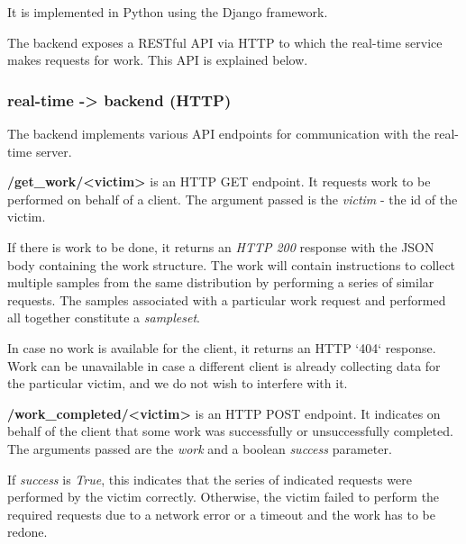 It is implemented in Python using the Django framework.

The backend exposes a RESTful API via HTTP to which the real-time service
makes requests for work. This API is explained below.

\subsubsection{real-time -> backend (HTTP)}

The backend implements various API endpoints for communication with the
real-time server.


\textbf{/get\_work/<victim>} is an HTTP GET endpoint. It requests work to 
be performed on behalf of a client. The argument passed is the \textit{victim}
- the id of the victim.

If there is work to be done, it returns an \textit{HTTP 200} response with the JSON
body containing the work structure. The work will contain instructions to
collect multiple samples from the same distribution by performing a series of
similar requests. The samples associated with a particular work request and
performed all together constitute a \textit{sampleset}.

In case no work is available for the client, it returns an HTTP `404` response.
Work can be unavailable in case a different client is already collecting data
for the particular victim, and we do not wish to interfere with it.

\textbf{/work\_completed/<victim>} is an HTTP POST endpoint. It indicates on behalf 
of the client that some work was successfully or unsuccessfully completed. The arguments
passed are the \textit{work} and a boolean \textit{success} parameter.

If \textit{success} is \textit{True}, this indicates that the series of indicated requests
were performed by the victim correctly. Otherwise, the victim failed to perform
the required requests due to a network error or a timeout and the work has to
be redone.


